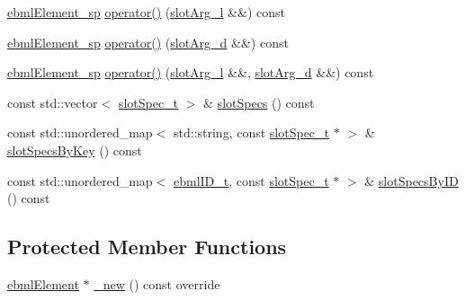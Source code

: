 \begin{DoxyCompactItemize}
\item 
\mbox{\hyperlink{namespaceebml_adad533b7705a16bb360fe56380c5e7be}{ebml\+Element\+\_\+sp}} \mbox{\hyperlink{classebml_1_1ebmlMultiSlotClass_ae62906b659277cc8de283a27a8bceed2}{operator()}} (\mbox{\hyperlink{namespaceebml_ae432575dfbb3e141ce897442794f0ca5}{slot\+Arg\+\_\+l}} \&\&) const
\item 
\mbox{\hyperlink{namespaceebml_adad533b7705a16bb360fe56380c5e7be}{ebml\+Element\+\_\+sp}} \mbox{\hyperlink{classebml_1_1ebmlMultiSlotClass_aaba4e03050493237191b214950972295}{operator()}} (\mbox{\hyperlink{namespaceebml_a4317d4c495715eced3ed448c2d05caeb}{slot\+Arg\+\_\+d}} \&\&) const
\item 
\mbox{\hyperlink{namespaceebml_adad533b7705a16bb360fe56380c5e7be}{ebml\+Element\+\_\+sp}} \mbox{\hyperlink{classebml_1_1ebmlMultiSlotClass_a22f33854de534b0cee9c7e2fe8d3be00}{operator()}} (\mbox{\hyperlink{namespaceebml_ae432575dfbb3e141ce897442794f0ca5}{slot\+Arg\+\_\+l}} \&\&, \mbox{\hyperlink{namespaceebml_a4317d4c495715eced3ed448c2d05caeb}{slot\+Arg\+\_\+d}} \&\&) const
\item 
const std\+::vector$<$ \mbox{\hyperlink{classebml_1_1slotSpec__t}{slot\+Spec\+\_\+t}} $>$ \& \mbox{\hyperlink{classebml_1_1ebmlMultiSlotClass_a8c0a510fb0de82566caa77d27127937c}{slot\+Specs}} () const
\item 
const std\+::unordered\+\_\+map$<$ std\+::string, const \mbox{\hyperlink{classebml_1_1slotSpec__t}{slot\+Spec\+\_\+t}} $\ast$ $>$ \& \mbox{\hyperlink{classebml_1_1ebmlMultiSlotClass_a57c1d13ad108cdd5b0cb0b717ef4ef92}{slot\+Specs\+By\+Key}} () const
\item 
const std\+::unordered\+\_\+map$<$ \mbox{\hyperlink{namespaceebml_a86c5f604ddf12a74aa9812e997a58691}{ebml\+I\+D\+\_\+t}}, const \mbox{\hyperlink{classebml_1_1slotSpec__t}{slot\+Spec\+\_\+t}} $\ast$ $>$ \& \mbox{\hyperlink{classebml_1_1ebmlMultiSlotClass_abb2d4a01a3c8048471cc26d5f14dc88d}{slot\+Specs\+By\+ID}} () const
\end{DoxyCompactItemize}
\subsection*{Protected Member Functions}
\begin{DoxyCompactItemize}
\item 
\mbox{\hyperlink{classebml_1_1ebmlElement}{ebml\+Element}} $\ast$ \mbox{\hyperlink{classebml_1_1ebmlMultiSlotClass_ab0cb2ed53ef6a3a8e64ffc47c72f5b94}{\+\_\+new}} () const override
\end{DoxyCompactItemize}

